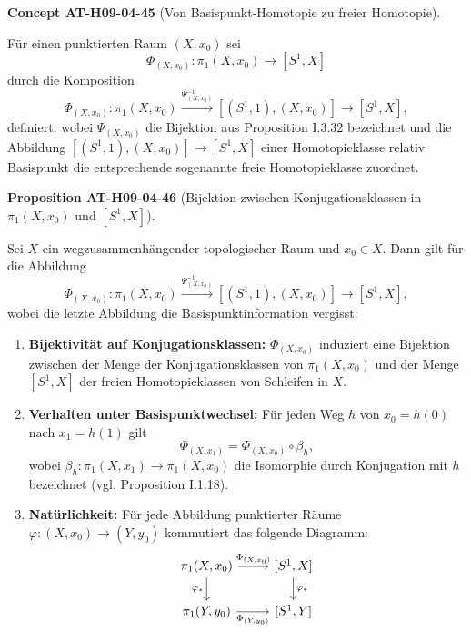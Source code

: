 \documentclass[10pt, letterpaper]{article}
\newcommand{\CustomHeading}[3]{%
  \par\medskip\noindent%
  \textbf{#1 #2} \textnormal{(#3)}.\enskip%
}
\newenvironment{PROP}[2]{\CustomHeading{Proposition}{#1}{#2}}{}
\newenvironment{CONC}[2]{\CustomHeading{Concept}{#1}{#2}}{}
\begin{document}
\begin{CONC}{AT-H09-04-45}{Von Basispunkt-Homotopie zu freier Homotopie}
Für einen punktierten Raum $\left(X, x_{0}\right)$ sei 
$$\Phi_{\left(X, x_{0}\right)}: \pi_{1}\left(X, x_{0}\right) \rightarrow\left[S^{1}, X\right]$$ 
durch die Komposition
$$
\Phi_{\left(X, x_{0}\right)}: \pi_{1}\left(X, x_{0}\right) \xrightarrow{\Psi_{\left(X, x_{0}\right)}^{-1}}\left[\left(S^{1}, 1\right),\left(X, x_{0}\right)\right] \rightarrow\left[S^{1}, X\right],
$$
definiert, wobei $\Psi_{\left(X, x_{0}\right)}$ die Bijektion aus Proposition I.3.32 bezeichnet und die Abbildung $\left[\left(S^{1}, 1\right),\left(X, x_{0}\right)\right] \rightarrow\left[S^{1}, X\right]$ einer Homotopieklasse relativ Basispunkt die entsprechende sogenannte freie Homotopieklasse zuordnet.
\end{CONC}

\begin{PROP}{AT-H09-04-46}{Bijektion zwischen Konjugationsklassen in $\pi_1\left(X, x_0\right)$ und $\left[S^1, X\right]$}
Sei \(X\) ein wegzusammenhängender topologischer Raum und \(x_0 \in X\). Dann gilt für die Abbildung
\[
\Phi_{\left(X, x_0\right)}: \pi_1\left(X, x_0\right) \xrightarrow{\Psi_{\left(X, x_0\right)}^{-1}}\left[\left(S^1, 1\right),\left(X, x_0\right)\right] \rightarrow\left[S^1, X\right],
\]
wobei die letzte Abbildung die Basispunktinformation vergisst:

\begin{enumerate}
  \item \textbf{Bijektivität auf Konjugationsklassen:} \(\Phi_{(X,x_0)}\) induziert eine Bijektion zwischen der Menge der Konjugationsklassen von \(\pi_1(X, x_0)\) und der Menge \([S^1, X]\) der freien Homotopieklassen von Schleifen in \(X\).
  
  \item \textbf{Verhalten unter Basispunktwechsel:} Für jeden Weg \(h\) von \(x_0 = h(0)\) nach \(x_1 = h(1)\) gilt
  \[
  \Phi_{(X,x_1)} = \Phi_{(X,x_0)} \circ \beta_h,
  \]
  wobei \(\beta_h: \pi_1(X, x_1) \to \pi_1(X, x_0)\) die Isomorphie durch Konjugation mit \(h\) bezeichnet (vgl. Proposition I.1.18).
  
  \item \textbf{Natürlichkeit:} Für jede Abbildung punktierter Räume \(\varphi: (X,x_0) \to (Y,y_0)\) kommutiert das folgende Diagramm:
  \[
  \begin{tikzcd}
  \pi_1(X, x_0) \arrow[r, "\Phi_{(X,x_0)}"] \arrow[d, "\varphi_*"'] & {[S^1, X]} \arrow[d, "\varphi_*"] \\
  \pi_1(Y, y_0) \arrow[r, "\Phi_{(Y,y_0)}"'] & {[S^1, Y]}
  \end{tikzcd}
  \]
\end{enumerate}
\end{PROP}
\end{document}
